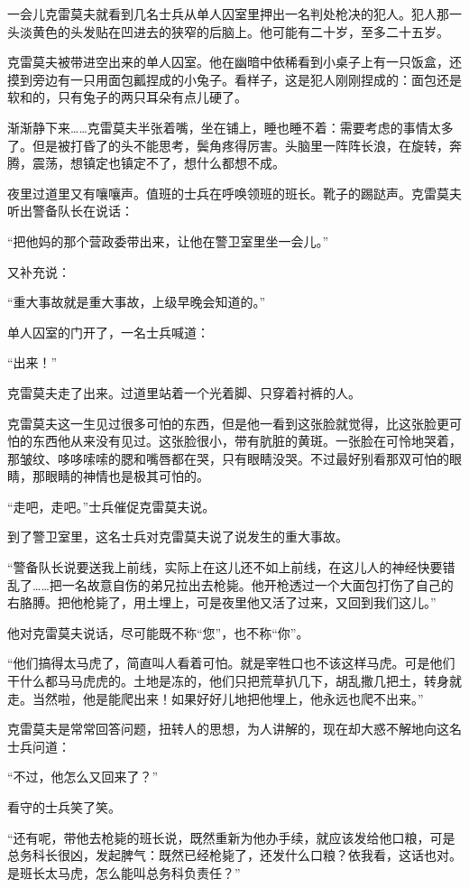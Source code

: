 一会儿克雷莫夫就看到几名士兵从单人囚室里押出一名判处枪决的犯人。犯人那一头淡黄色的头发贴在凹进去的狭窄的后脑上。他可能有二十岁，至多二十五岁。

克雷莫夫被带进空出来的单人囚室。他在幽暗中依稀看到小桌子上有一只饭盒，还摸到旁边有一只用面包瓤捏成的小兔子。看样子，这是犯人刚刚捏成的：面包还是软和的，只有兔子的两只耳朵有点儿硬了。

渐渐静下来……克雷莫夫半张着嘴，坐在铺上，睡也睡不着：需要考虑的事情太多了。但是被打昏了的头不能思考，鬓角疼得厉害。头脑里一阵阵长浪，在旋转，奔腾，震荡，想镇定也镇定不了，想什么都想不成。

夜里过道里又有嚷嚷声。值班的士兵在呼唤领班的班长。靴子的踢跶声。克雷莫夫听出警备队长在说话：

“把他妈的那个营政委带出来，让他在警卫室里坐一会儿。”

又补充说：

“重大事故就是重大事故，上级早晚会知道的。”

单人囚室的门开了，一名士兵喊道：

“出来！”

克雷莫夫走了出来。过道里站着一个光着脚、只穿着衬裤的人。

克雷莫夫这一生见过很多可怕的东西，但是他一看到这张脸就觉得，比这张脸更可怕的东西他从来没有见过。这张脸很小，带有肮脏的黄斑。一张脸在可怜地哭着，那皱纹、哆哆嗦嗦的腮和嘴唇都在哭，只有眼睛没哭。不过最好别看那双可怕的眼睛，那眼睛的神情也是极其可怕的。

“走吧，走吧。”士兵催促克雷莫夫说。

到了警卫室里，这名士兵对克雷莫夫说了说发生的重大事故。

“警备队长说要送我上前线，实际上在这儿还不如上前线，在这儿人的神经快要错乱了……把一名故意自伤的弟兄拉出去枪毙。他开枪透过一个大面包打伤了自己的右胳膊。把他枪毙了，用土埋上，可是夜里他又活了过来，又回到我们这儿。”

他对克雷莫夫说话，尽可能既不称“您”，也不称“你”。

“他们搞得太马虎了，简直叫人看着可怕。就是宰牲口也不该这样马虎。可是他们干什么都马马虎虎的。土地是冻的，他们只把荒草扒几下，胡乱撒几把土，转身就走。当然啦，他是能爬出来！如果好好儿地把他埋上，他永远也爬不出来。”

克雷莫夫是常常回答问题，扭转人的思想，为人讲解的，现在却大惑不解地向这名士兵问道：

“不过，他怎么又回来了？”

看守的士兵笑了笑。

“还有呢，带他去枪毙的班长说，既然重新为他办手续，就应该发给他口粮，可是总务科长很凶，发起脾气：既然已经枪毙了，还发什么口粮？依我看，这话也对。是班长太马虎，怎么能叫总务科负责任？”

